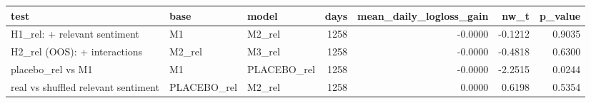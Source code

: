 \begin{tabular}{lllrrrr}
\toprule
test & base & model & days & mean\_daily\_logloss\_gain & nw\_t & p\_value \\
\midrule
H1\_rel: + relevant sentiment & M1 & M2\_rel & 1258 & -0.0000 & -0.1212 & 0.9035 \\
H2\_rel (OOS): + interactions & M2\_rel & M3\_rel & 1258 & -0.0000 & -0.4818 & 0.6300 \\
placebo\_rel vs M1 & M1 & PLACEBO\_rel & 1258 & -0.0000 & -2.2515 & 0.0244 \\
real vs shuffled relevant sentiment & PLACEBO\_rel & M2\_rel & 1258 & 0.0000 & 0.6198 & 0.5354 \\
\bottomrule
\end{tabular}
